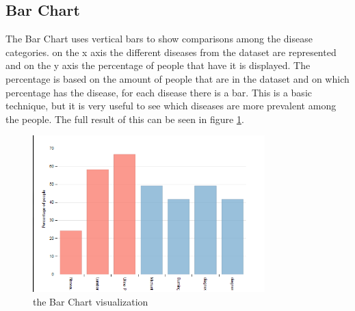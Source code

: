 \documentclass[a4paper,twoside,11pt]{article}
\begin{document}
\subsection{Bar Chart}
The Bar Chart uses vertical bars to show comparisons among the disease categories. on the x axis the different diseases from the dataset are represented and on the y axis the percentage of people that have it is displayed. The percentage is based on the amount of people that are in the dataset and on which percentage has the disease, for each disease there is a bar. This is a basic technique, but it is very useful to see which diseases are more prevalent among the people. The full result of this can be seen in figure \ref{fig:Bar}.
\begin{figure}[h]
\begin{center}
    \includegraphics[width=0.8\textwidth]{images/barChart.PNG}
    \caption{the Bar Chart visualization}
    \label{fig:Bar}
\end{center}
\end{figure}
\newpage
\end{document}
